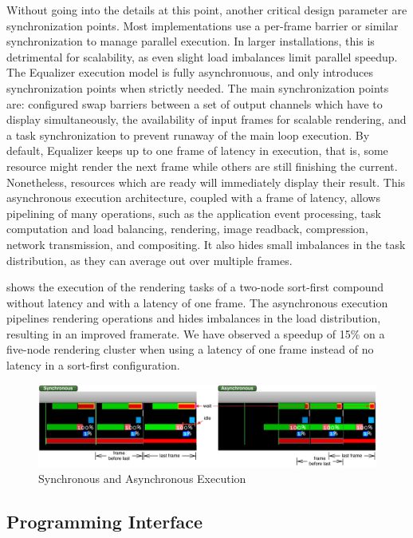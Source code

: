 Without going into the details at this point, another critical design parameter
are synchronization points. Most implementations use a per-frame barrier or
similar synchronization to manage parallel execution. In larger installations,
this is detrimental for scalability, as even slight load imbalances limit
parallel speedup. The Equalizer execution model is fully asynchronuous, and
only introduces synchronization points when strictly needed. The main
synchronization points are: configured swap barriers between a set of output
channels which have to display simultaneously, the availability of input frames
for scalable rendering, and a task synchronization to prevent runaway of the
main loop execution. By default, Equalizer keeps up to one frame of latency in
execution, that is, some resource might render the next frame while others are
still finishing the current. Nonetheless, resources which are ready will
immediately display their result. This asynchronous execution architecture,
coupled with a frame of latency, allows pipelining of many operations, such as
the application event processing, task computation and load balancing,
rendering, image readback, compression, network transmission, and compositing.
It also hides small imbalances in the task distribution, as they can average
out over multiple frames.

 shows the execution of the rendering tasks of a two-node
sort-first compound without latency and with a latency of one frame. The
asynchronous execution pipelines rendering operations and hides imbalances in
the load distribution, resulting in an improved framerate. We have observed a
speedup of 15\% on a five-node rendering cluster when using a latency of one
frame instead of no latency in a sort-first configuration.

\begin{figure}[ht!]\center
 \includegraphics[width=\textwidth]{images/syncAsync}
 {\caption{\label{fSyncAsync}Synchronous and Asynchronous Execution}}
\end{figure}


\subsection{Programming Interface}

